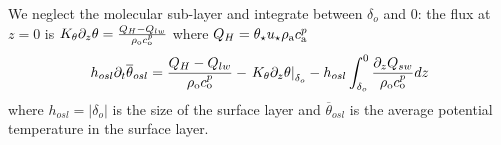 \par
We neglect the molecular sub-layer and
integrate between $\delta_o$ and 0:
the flux at $z=0$ is
$K_\theta \partial_z \theta = \frac{Q_H - Q_{lw}}{\rho_{\rm o} c_{\rm o}^p}$
where $Q_H = \theta_\star u_\star \rho_{\rm a} c_{\rm a}^p$
\begin{equation}
\label{eq:evolEqOSL}
h_{osl}\partial_t \overline{\theta}_{osl} =
	\frac{Q_H - Q_{lw}}{\rho_{\rm o} c_{\rm o}^p}
- \left. K_\theta \partial_z \theta 
\right|_{\delta_{o}}
- h_{osl}\int_{\delta_o}^0
	\frac{\partial_z Q_{sw}}{\rho_{\rm o} c_{\rm o}^p} dz
\end{equation}
where $h_{osl} = |\delta_o|$
is the size of the surface layer and
$\overline{\theta}_{osl}$ is the average potential
temperature in the surface layer.
